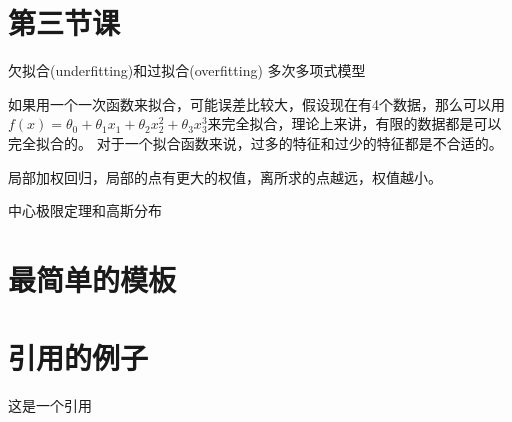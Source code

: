 \documentclass[a4paper,12pt]{ctexbook}
\begin{document}
\section{第三节课}
欠拟合(underfitting)和过拟合(overfitting)
多次多项式模型

如果用一个一次函数来拟合，可能误差比较大，假设现在有4个数据，那么可以用$f(x)=\theta_{0}+\theta_{1}x_{1}+\theta_2x{_2^2}+\theta_3x{_3^3}$来完全拟合，理论上来讲，有限的数据都是可以完全拟合的。
对于一个拟合函数来说，过多的特征和过少的特征都是不合适的。

局部加权回归，局部的点有更大的权值，离所求的点越远，权值越小。

中心极限定理和高斯分布

\section{最简单的模板}


\section{引用的例子}
这是一个引用~\cite{LCN2002}


%


%
%

%
\end{document}
